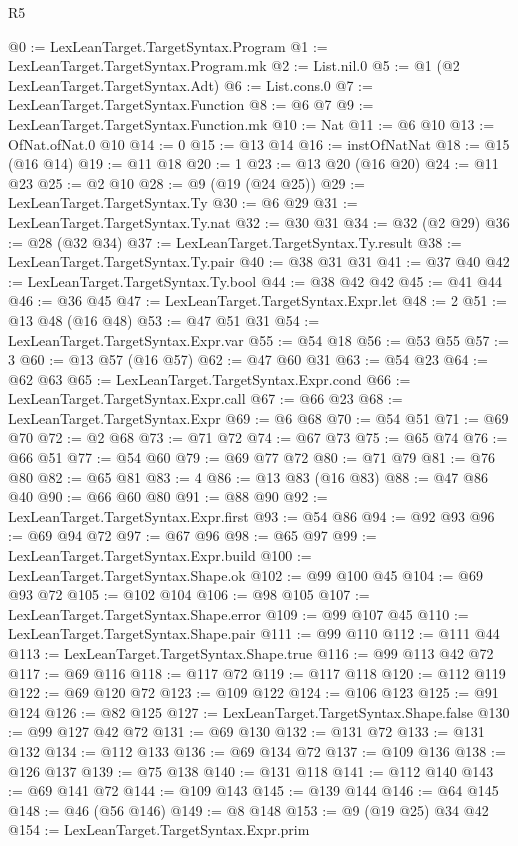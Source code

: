 \begin{lexlean}{R5}
\begin{coremodule}
@0 := LexLeanTarget.TargetSyntax.Program
@1 := LexLeanTarget.TargetSyntax.Program.mk
@2 := List.nil.{0}
@5 := @1 (@2 LexLeanTarget.TargetSyntax.Adt)
@6 := List.cons.{0}
@7 := LexLeanTarget.TargetSyntax.Function
@8 := @6 @7
@9 := LexLeanTarget.TargetSyntax.Function.mk
@10 := Nat
@11 := @6 @10
@13 := OfNat.ofNat.{0} @10
@14 := 0
@15 := @13 @14
@16 := instOfNatNat
@18 := @15 (@16 @14)
@19 := @11 @18
@20 := 1
@23 := @13 @20 (@16 @20)
@24 := @11 @23
@25 := @2 @10
@28 := @9 (@19 (@24 @25))
@29 := LexLeanTarget.TargetSyntax.Ty
@30 := @6 @29
@31 := LexLeanTarget.TargetSyntax.Ty.nat
@32 := @30 @31
@34 := @32 (@2 @29)
@36 := @28 (@32 @34)
@37 := LexLeanTarget.TargetSyntax.Ty.result
@38 := LexLeanTarget.TargetSyntax.Ty.pair
@40 := @38 @31 @31
@41 := @37 @40
@42 := LexLeanTarget.TargetSyntax.Ty.bool
@44 := @38 @42 @42
@45 := @41 @44
@46 := @36 @45
@47 := LexLeanTarget.TargetSyntax.Expr.let
@48 := 2
@51 := @13 @48 (@16 @48)
@53 := @47 @51 @31
@54 := LexLeanTarget.TargetSyntax.Expr.var
@55 := @54 @18
@56 := @53 @55
@57 := 3
@60 := @13 @57 (@16 @57)
@62 := @47 @60 @31
@63 := @54 @23
@64 := @62 @63
@65 := LexLeanTarget.TargetSyntax.Expr.cond
@66 := LexLeanTarget.TargetSyntax.Expr.call
@67 := @66 @23
@68 := LexLeanTarget.TargetSyntax.Expr
@69 := @6 @68
@70 := @54 @51
@71 := @69 @70
@72 := @2 @68
@73 := @71 @72
@74 := @67 @73
@75 := @65 @74
@76 := @66 @51
@77 := @54 @60
@79 := @69 @77 @72
@80 := @71 @79
@81 := @76 @80
@82 := @65 @81
@83 := 4
@86 := @13 @83 (@16 @83)
@88 := @47 @86 @40
@90 := @66 @60 @80
@91 := @88 @90
@92 := LexLeanTarget.TargetSyntax.Expr.first
@93 := @54 @86
@94 := @92 @93
@96 := @69 @94 @72
@97 := @67 @96
@98 := @65 @97
@99 := LexLeanTarget.TargetSyntax.Expr.build
@100 := LexLeanTarget.TargetSyntax.Shape.ok
@102 := @99 @100 @45
@104 := @69 @93 @72
@105 := @102 @104
@106 := @98 @105
@107 := LexLeanTarget.TargetSyntax.Shape.error
@109 := @99 @107 @45
@110 := LexLeanTarget.TargetSyntax.Shape.pair
@111 := @99 @110
@112 := @111 @44
@113 := LexLeanTarget.TargetSyntax.Shape.true
@116 := @99 @113 @42 @72
@117 := @69 @116
@118 := @117 @72
@119 := @117 @118
@120 := @112 @119
@122 := @69 @120 @72
@123 := @109 @122
@124 := @106 @123
@125 := @91 @124
@126 := @82 @125
@127 := LexLeanTarget.TargetSyntax.Shape.false
@130 := @99 @127 @42 @72
@131 := @69 @130
@132 := @131 @72
@133 := @131 @132
@134 := @112 @133
@136 := @69 @134 @72
@137 := @109 @136
@138 := @126 @137
@139 := @75 @138
@140 := @131 @118
@141 := @112 @140
@143 := @69 @141 @72
@144 := @109 @143
@145 := @139 @144
@146 := @64 @145
@148 := @46 (@56 @146)
@149 := @8 @148
@153 := @9 (@19 @25) @34 @42
@154 := LexLeanTarget.TargetSyntax.Expr.prim

\end{coremodule}
\end{lexlean}
